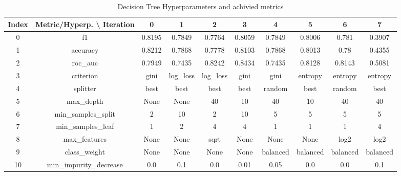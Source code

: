 \documentclass{article}%
\begin{document}
%


\begin{table}[h!]%
\caption{Decision Tree Hyperparameters and achivied metrics}%
\vspace{0.2cm}%
\centering%
\begin{tabular}{|c||c||c||c||c||c||c||c||c||c|}%
\hline%
Index&Metric/Hyperp. \textbackslash{} Iteration&0&1&2&3&4&5&6&7\\%
\hline%
0&f1&0.8195&0.7849&0.7764&0.8059&0.7849&0.8006&0.781&0.3907\\%
1&accuracy&0.8212&0.7868&0.7778&0.8103&0.7868&0.8013&0.78&0.4355\\%
2&roc\_auc&0.7949&0.7435&0.8242&0.8434&0.7435&0.8128&0.8143&0.5081\\%
3&criterion&gini&log\_loss&log\_loss&gini&gini&entropy&entropy&entropy\\%
4&splitter&best&best&best&best&random&best&random&best\\%
5&max\_depth&None&None&40&10&40&10&40&40\\%
6&min\_samples\_split&2&10&2&10&5&5&5&5\\%
7&min\_samples\_leaf&1&2&4&4&1&1&1&4\\%
8&max\_features&None&None&sqrt&None&None&None&log2&log2\\%
9&class\_weight&None&None&None&None&balanced&balanced&balanced&balanced\\%
10&min\_impurity\_decrease&0.0&0.1&0.0&0.01&0.05&0.0&0.0&0.1\\%
\hline%
\end{tabular}%
\end{table}

%
\end{document}
